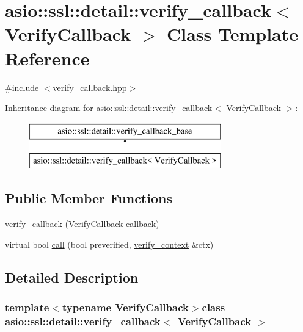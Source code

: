 \hypertarget{classasio_1_1ssl_1_1detail_1_1verify__callback}{}\section{asio\+:\+:ssl\+:\+:detail\+:\+:verify\+\_\+callback$<$ Verify\+Callback $>$ Class Template Reference}
\label{classasio_1_1ssl_1_1detail_1_1verify__callback}


{\ttfamily \#include $<$verify\+\_\+callback.\+hpp$>$}

Inheritance diagram for asio\+:\+:ssl\+:\+:detail\+:\+:verify\+\_\+callback$<$ Verify\+Callback $>$\+:\begin{figure}[H]
\begin{center}
\leavevmode
\includegraphics[height=2.000000cm]{classasio_1_1ssl_1_1detail_1_1verify__callback}
\end{center}
\end{figure}
\subsection*{Public Member Functions}
\begin{DoxyCompactItemize}
\item 
\hyperlink{classasio_1_1ssl_1_1detail_1_1verify__callback_a6ff2c6fd2f5c56c12eb456aa29202237}{verify\+\_\+callback} (Verify\+Callback callback)
\item 
virtual bool \hyperlink{classasio_1_1ssl_1_1detail_1_1verify__callback_a02730f79fdfd48222108cc73a2b65d36}{call} (bool preverified, \hyperlink{classasio_1_1ssl_1_1verify__context}{verify\+\_\+context} \&ctx)
\end{DoxyCompactItemize}


\subsection{Detailed Description}
\subsubsection*{template$<$typename Verify\+Callback$>$class asio\+::ssl\+::detail\+::verify\+\_\+callback$<$ Verify\+Callback $>$}



